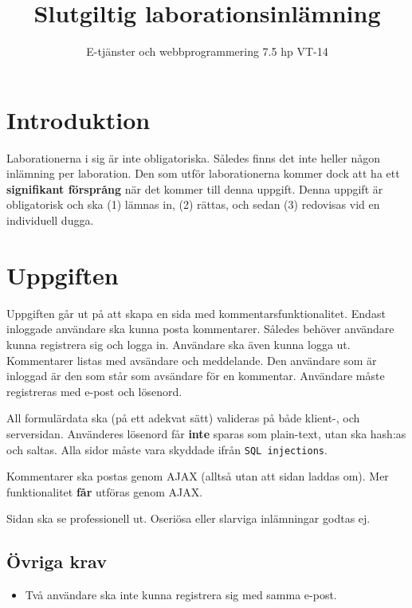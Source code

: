 \documentclass[12pt]{article}
\date{}
\title{ Slutgiltig laborationsinlämning }
\author{ E-tjänster och webbprogrammering 7.5 hp VT-14 }
\begin{document}
\maketitle
\vspace{-2em}



\section{Introduktion}
Laborationerna i sig är inte obligatoriska. Således finns det inte heller någon inlämning per laboration. Den som utför laborationerna kommer dock att ha ett \textbf{signifikant försprång} när det kommer till denna uppgift. Denna uppgift är obligatorisk och ska (1) lämnas in, (2) rättas, och sedan (3) redovisas vid en individuell dugga.

\section{Uppgiften}
Uppgiften går ut på att skapa en sida med kommentarsfunktionalitet. Endast inloggade användare ska kunna posta kommentarer. Således behöver användare kunna registrera sig och logga in. Användare ska även kunna logga ut. Kommentarer listas med avsändare och meddelande. Den användare som är inloggad är den som står som avsändare för en kommentar. Användare måste registreras med e-post och lösenord.

All formulärdata ska (på ett adekvat sätt) valideras på både klient-, och serversidan. Använderes lösenord får \textbf{inte} sparas som plain-text, utan ska hash:as och saltas. Alla sidor måste vara skyddade ifrån \texttt{SQL injections}.

Kommentarer ska postas genom AJAX (alltså utan att sidan laddas om). Mer funktionalitet \textbf{får} utföras genom AJAX.

Sidan ska se professionell ut. Oseriösa eller slarviga inlämningar godtas ej.

\subsection{Övriga krav}
\begin{itemize}
  \item Två användare ska inte kunna registrera sig med samma e-post.
\end{itemize}
\end{document}
